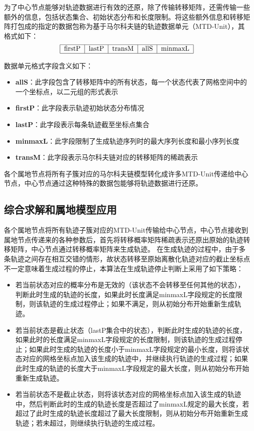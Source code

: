 
为了中心节点能够对轨迹数据进行有效的还原，除了传输转移矩阵，还需传输一些额外的信息，包括状态集合、初始状态分布和长度限制。将这些额外信息和转移矩阵打包成的指定的数据包称为基于马尔科夫链的轨迹数据单元（MTD-Unit），其格式如下：
$$
\begin{tabular}{|c|c|c|c|c|}
\hline firstP&lastP&transM&allS&minmaxL\\
\hline
\end{tabular}
$$

数据单元格式字段含义如下：
\begin{itemize}
\item \textbf{allS}：此字段包含了转移矩阵中的所有状态，每一个状态代表了网格空间中的一个坐标点，以二元组的形式表示
\item \textbf{firstP}：此字段表示轨迹初始状态分布情况
\item \textbf{lastP}：此字段表示每条轨迹截至坐标点集合
\item \textbf{minmaxL}：此字段限制了生成轨迹序列时的最大序列长度和最小序列长度
\item \textbf{transM}：此字段表示马尔科夫链对应的转移矩阵的稀疏表示
\end{itemize}

各个属地节点将所有子簇对应的马尔科夫链模型转化成许多MTD-Unit传递给中心节点，中心节点通过这种特殊的数据包能够将轨迹数据进行还原。

\subsection{综合求解和属地模型应用}

各个属地节点将所有轨迹子簇对应的MTD-Unit传输给中心节点，中心节点接收到属地节点传递来的各种参数后，首先将转移概率矩阵稀疏表示还原出原始的轨迹转移矩阵，中心节点通过转移概率矩阵来生成轨迹。
在生成轨迹的过程中，由于多条轨迹之间存在相互交错的情形，故状态转移至原始离散化轨迹对应的截止坐标点不一定意味着生成过程的停止，本算法在生成轨迹停止判断上采用了如下策略：
\begin{itemize}
\item 若当前状态对应的概率分布是无效的（该状态不会转移至任何其他的状态），判断此时生成的轨迹的长度，如果此时长度满足minmaxL字段规定的长度限制，则该轨迹的生成过程停止；如果不满足，则从初始分布开始重新生成轨迹。
\item 若当前状态是截止状态（lastP集合中的状态），判断此时生成的轨迹的长度，如果此时的长度满足minmaxL字段规定的长度限制，则该轨迹的生成过程停止；如果此时生成的轨迹的长度小于minmaxL字段规定的最小长度，则将该状态对应的网格坐标点加入该生成的轨迹中，并继续执行轨迹的生成过程；如果此时生成的轨迹的长度大于minmaxL字段规定的最大长度，则从初始分布开始重新生成轨迹。
\item 若当前状态不是截止状态，则将该状态对应的网格坐标点加入该生成的轨迹中，然后判断此时的生成的轨迹长度是否超过了minmaxL规定的最大长度，若超过了此时生成的轨迹长度超过了最大长度限制，则从初始分布开始重新生成轨迹；若未超过，则继续执行轨迹的生成过程。
\end{itemize}

